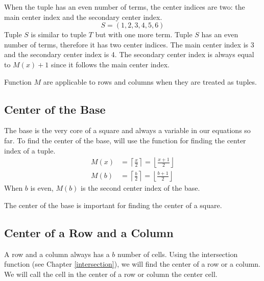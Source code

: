 \documentclass[letterpaper, twoside,12pt]{article}
\begin{document}
    When the tuple has an even number of terms, the center indices are two: the main center index and the secondary center index.
    \begin{equation*}
        S = (1,2,3,4,5,6)
    \end{equation*}
    Tuple $S$ is similar to tuple $T$ but with one more term. Tuple $S$ has an even number of terms, therefore it has two center indices. The main center index is 3 and the secondary center index is 4. The secondary center index is always equal to $M(x) + 1$ since it follows the main center index.

    Function $M$ are applicable to rows and columns when they are treated as tuples.

    \subsection{Center of the Base} \label{center_base}
    The base is the very core of a square and always a variable in our equations so far. To find the center of the base, will use the function for finding the center index of a tuple.
    \begin{equation}
        \begin{split}
            M(x) &= \left\lceil \frac{x}{2} \right\rceil = \left\lfloor \frac{x+1}{2} \right\rfloor \\
            M(b) &= \left\lceil \frac{b}{2} \right\rceil = \left\lfloor \frac{b+1}{2} \right\rfloor
        \end{split}
    \end{equation}
    When $b$ is even, $M(b)$ is the second center index of the base.

    The center of the base is important for finding the center of a square.

    \subsection{Center of a Row and a Column} \label{center_row_column}
    A row and a column always has a $b$ number of cells. Using the intersection function (see Chapter \ref{intersection}), we will find the center of a row or a column. We will call the cell in the center of a row or column the center cell.
\end{document}
